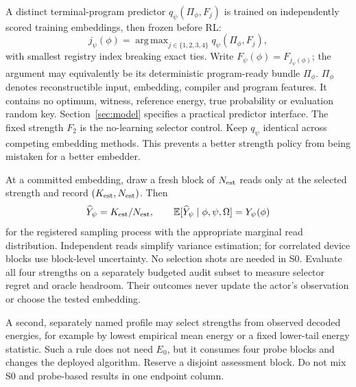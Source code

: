 \documentclass[11pt,a4paper]{article}
\newcommand{\E}{\mathbb{E}}
\DeclareMathOperator*{\argmax}{arg\,max}
\theoremstyle{definition}\newtheorem{definition}[proposition]{Definition}
\begin{document}
A distinct terminal-program predictor $q_\psi(\Pi_\phi,F_j)$ is trained on independently scored training embeddings, then frozen before RL:
\begin{equation}
j_\psi(\phi)=\argmax_{j\in\{1,2,3,4\}}q_\psi(\Pi_\phi,F_j),
\label{eq:strength-selector}
\end{equation}
with smallest registry index breaking exact ties. Write $F_\psi(\phi)=F_{j_\psi(\phi)}$; the argument may equivalently be its deterministic program-ready bundle $\Pi_\phi$. $\Pi_\phi$ denotes reconstructible input, embedding, compiler and program features. It contains no optimum, witness, reference energy, true probability or evaluation random key. Section~\ref{sec:model} specifies a practical predictor interface. The fixed strength $F_2$ is the no-learning selector control. Keep $q_\psi$ identical across competing embedding methods. This prevents a better strength policy from being mistaken for a better embedder.

At a committed embedding, draw a fresh block of $N_{\rm est}$ reads only at the selected strength and record $(K_{\rm est},N_{\rm est})$. Then
\begin{equation}
\widehat Y_\psi=K_{\rm est}/N_{\rm est},\qquad
\E[\widehat Y_\psi\mid\phi,\psi,\Omega]=Y_\psi(\phi)
\label{eq:unbiased}
\end{equation}
for the registered sampling process with the appropriate marginal read distribution. Independent reads simplify variance estimation; for correlated device blocks use block-level uncertainty. No selection shots are needed in S0. Evaluate all four strengths on a separately budgeted audit subset to measure selector regret and oracle headroom. Their outcomes never update the actor's observation or choose the tested embedding.

A second, separately named profile may select strengths from observed decoded energies, for example by lowest empirical mean energy or a fixed lower-tail energy statistic. Such a rule does not need $E_0$, but it consumes four probe blocks and changes the deployed algorithm. Reserve a disjoint assessment block. Do not mix S0 and probe-based results in one endpoint column.
\end{document}
